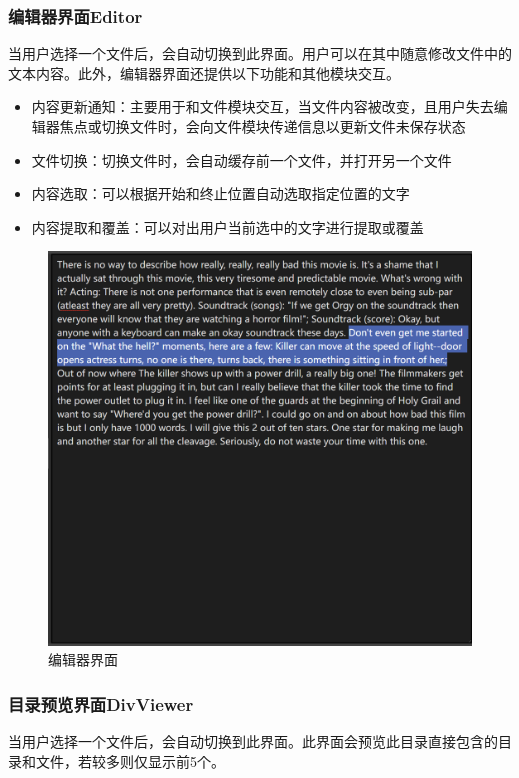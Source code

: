 \documentclass[scheme = chinese]{ctexart}
\begin{document}
\subsubsection{编辑器界面Editor}
当用户选择一个文件后，会自动切换到此界面。用户可以在其中随意修改文件中的文本内容。此外，编辑器界面还提供以下功能和其他模块交互。
\begin{itemize}
    \item 内容更新通知：主要用于和文件模块交互，当文件内容被改变，且用户失去编辑器焦点或切换文件时，会向文件模块传递信息以更新文件未保存状态
    \item 文件切换：切换文件时，会自动缓存前一个文件，并打开另一个文件
    \item 内容选取：可以根据开始和终止位置自动选取指定位置的文字
    \item 内容提取和覆盖：可以对出用户当前选中的文字进行提取或覆盖
\end{itemize}

\begin{figure}[h]
    \centering
    \includegraphics[width=\textwidth]{images/Editor.png}
    \caption{编辑器界面}
\end{figure}

\clearpage

\subsubsection{目录预览界面DivViewer}
当用户选择一个文件后，会自动切换到此界面。此界面会预览此目录直接包含的目录和文件，若较多则仅显示前5个。
\end{document}
